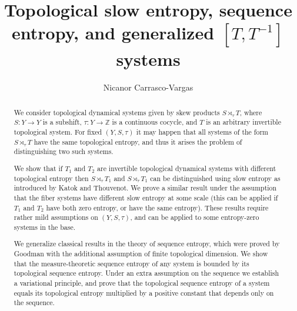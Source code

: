 \documentclass[a4paper,oneside]{amsart}
\title{Topological slow entropy, sequence entropy, and generalized $[T,T^{-1}]$ systems}
\author{Nicanor Carrasco-Vargas}
\renewcommand{\(}{\begin{dmath*}}
\renewcommand{\)}{\end{dmath*}}
\theoremstyle{definition}
\newcommand{\Z}{\mathbb{Z}}
\begin{document}
\maketitle
\begin{abstract}
We consider topological dynamical systems given by skew products $S\rtimes_{\tau} T$, where $S\colon Y\to Y$ is a subshift, $\tau\colon Y\to\Z$ is a continuous cocycle, and $T$ is an arbitrary invertible topological system. For fixed $(Y,S,\tau)$ it may happen that all systems of the form $S\rtimes_\tau T$ have the same topological entropy, and thus it arises the problem of distinguishing two such systems.


We show that if $T_1$ and $T_2$ are invertible topological dynamical systems with different topological entropy then $S\rtimes_{\tau} T_1$ and $S\rtimes_{\tau} T_1$ can be distinguished using slow entropy as introduced by Katok and Thouvenot. We prove a similar result under the assumption that the fiber systems have different slow entropy at some scale (this can be applied if $T_1$ and $T_2$ have both zero entropy, or have the same entropy). These results 
require rather mild assumptions on $(Y,S,\tau)$, and can be applied to some entropy-zero systems in the base. %

We generalize classical results in the theory of sequence entropy, which were proved by Goodman with  the additional assumption of finite topological dimension. We show that the measure-theoretic sequence entropy of any system is bounded by its topological sequence entropy. Under an extra assumption on the sequence we establish a variational principle, and prove that the topological sequence entropy of a system equals its topological entropy multiplied by a positive constant that depends only on the sequence. 
\end{abstract}
\end{document}
